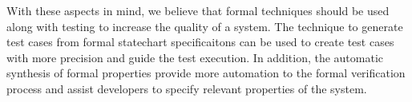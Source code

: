 With these aspects in mind, we believe that formal techniques should be used along with testing to increase the quality of a system. The technique to generate test cases from formal statechart specificaitons can be used to create test cases with more precision and guide the test execution. In addition, the automatic synthesis of formal properties provide more automation to the formal verification process and assist developers to specify relevant properties of the system.
